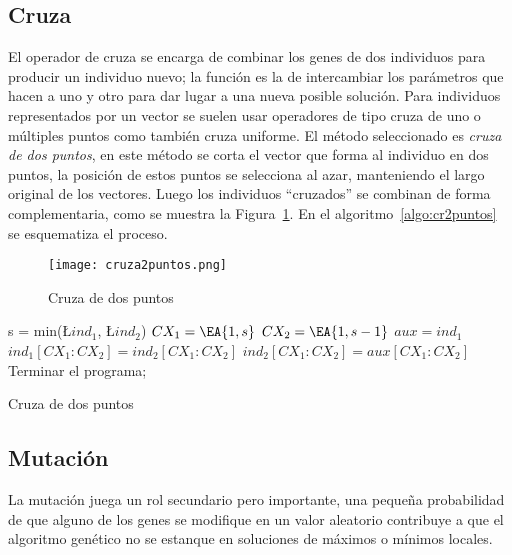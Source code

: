 \subsection{Cruza}
%
El operador de cruza se encarga de combinar los genes de dos individuos para
producir un individuo nuevo; la función es la de intercambiar los parámetros que
hacen a uno y otro para dar lugar a una nueva posible solución.
%
Para individuos representados por un vector se suelen usar operadores de tipo
cruza de uno o múltiples puntos como también cruza uniforme.
%
El método seleccionado es \emph{cruza de dos puntos}, en este método
se corta el vector que forma al individuo en dos puntos, la posición de estos
puntos se selecciona al azar, manteniendo el largo original de los vectores.
%
Luego los individuos ``cruzados'' se combinan de forma complementaria, como se muestra
la Figura~\ref{fig:cr2puntos}.
%
En el algoritmo~\ref{algo:cr2puntos} se esquematiza
el proceso.
%

\begin{figure}[ht!]
  \centering
  \texttt{[image: cruza2puntos.png]}
  \caption{Cruza de dos puntos}\label{fig:cr2puntos}
\end{figure}


\begin{algorithm}[]
  \BlankLine
  s = min(\L{$ind_{1}$}, \L {$ind_{2}$})\;
  $CX_{1} = \EA{1, s}$\;
  $CX_{2} = \EA{1, s-1}$\;
  $aux = ind_{1}$\;
  $ind_{1}[CX_{1}:CX_{2}] = ind_{2}[CX_{1}:CX_{2}]$\;
  $ind_{2}[CX_{1}:CX_{2}] = aux[CX_{1}:CX_{2}]$\;
  \;
  Terminar el programa;
  \caption{Cruza de dos puntos}\label{algo:cr2puntos}
\end{algorithm}

\subsection{Mutación}
%
La mutación juega un rol secundario pero importante, una pequeña probabilidad
de que alguno de los genes se modifique en un valor aleatorio contribuye a que
el algoritmo genético no se estanque en soluciones de máximos o mínimos locales.


